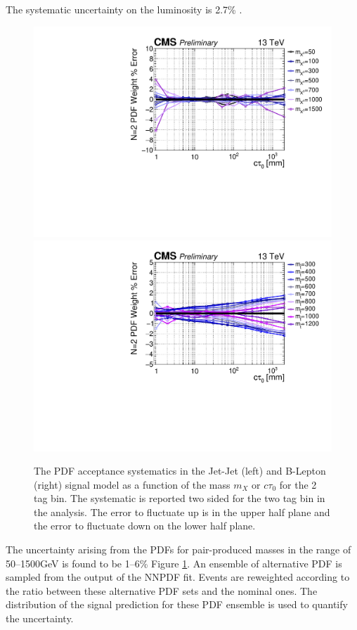 The systematic uncertainty on the luminosity is 2.7\% \cite{LUMI}.


\begin{figure}
\begin{center}
\includegraphics[width=.45\textwidth]{figures/an/SYSTEMATICS/76x_pu/sys_2tag_pdf.pdf}
\includegraphics[width=.45\textwidth]{figures/an/SYSTEMATICS/76x_pu/sys_2tag_pdf_dsusy.pdf}
\caption{The PDF acceptance  systematics in the Jet-Jet (left)
 and B-Lepton (right) signal model as a function of the mass $m_X$ 
or $c\tau_0$ for the 2 tag bin. The systematic is reported two sided 
for the two tag bin in the analysis. The error to fluctuate up is in
 the upper half plane and the error to fluctuate down on the lower half plane.  \label{fig:pdf_sys}}
\end{center}
\end{figure}

The uncertainty arising from the PDFs for pair-produced masses in the
range of 50--1500GeV is found to be 1--6\% Figure \ref{fig:pdf_sys}.  An ensemble of
alternative PDF is sampled from the output of the NNPDF fit.  Events
are reweighted according to the ratio between these alternative PDF
sets and the nominal ones. The distribution of the signal prediction
for these PDF ensemble is used to quantify the uncertainty.

